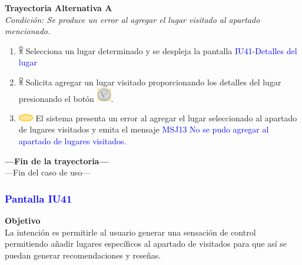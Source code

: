 \textbf{Trayectoria Alternativa A}\\
\textit{Condición: Se produce un error al agregar el lugar visitado al apartado mencionado.}
\begin{enumerate}
    \item \includegraphics[width=0.0150\textwidth]{Figuras/persona.png} Selecciona un lugar determinado y se despleja la pantalla {\textcolor{blue}{IU41-Detalles del lugar}}
    \item \includegraphics[width=0.0150\textwidth]{Figuras/persona.png} Solicita agregar un lugar visitado proporcionando los detalles del lugar presionando el botón \includegraphics[width=0.0500\textwidth]{ComponentesCU/MarcarVisitado.PNG}.
    \item \includegraphics[width=0.0500\textwidth]{Figuras/sistema.png} El sistema presenta un error al agregar el lugar seleccionado al apartado de lugares visitados y emita el mensaje {\textcolor{blue}{MSJ13 No se pudo agregar al apartado de lugares visitados}}.
\end{enumerate}
\textbf{---Fin de la trayectoria---}
\vspace{0.5cm}\\
---Fin del caso de uso---
\newpage

\subsubsection{\textcolor{blue}{Pantalla IU41}}
\textbf{Objetivo} \\
La intención es permitirle al usuario generar una sensación de control permitiendo añadir lugares específicos al apartado de visitados para que así se puedan generar recomendaciones y reseñas.
\vspace{15pt}

